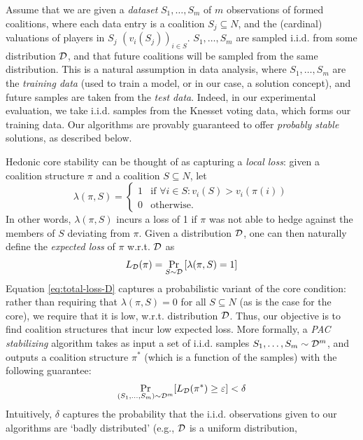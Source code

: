 Assume that we are given a {\em dataset} $S_1,\dots,S_m$ of $m$ observations
of formed coalitions, where each data entry is a coalition $S_j \subseteq N$,
and the (cardinal) valuations of players in $S_j$ $(v_i(S_j))_{i \in S}$.
$S_1,\dots,S_m$ are sampled i.i.d. from some distribution $\cal D$, and that
future coalitions will be sampled from the same distribution.
This is a natural assumption in data analysis, where $S_1,\dots,S_m$ are the
{\em training data} (used to train a model, or in our case, a solution concept),
and future samples are taken from the {\em test data}.
Indeed, in our experimental evaluation, we take i.i.d. samples from the Knesset
voting data, which forms our training data.
Our algorithms are provably guaranteed to offer {\em probably stable} solutions,
as described below.

Hedonic core stability can be thought of as capturing a {\em local loss}: given
a coalition structure $\pi$ and a coalition $S \subseteq N$, let
$$\lambda(\pi,S) = \begin{cases}1 & \mbox{if }\forall i \in S: v_i(S) > v_i(\pi(i))\\0&\mbox{otherwise.}\end{cases}$$
In other words, $\lambda(\pi,S)$ incurs a loss of 1 if $\pi$ was not able to
hedge against the members of $S$ deviating from $\pi$. Given a distribution
$\cal D$, one can then naturally define the {\em expected loss} of $\pi$ w.r.t.
$\cal D$ as
\begin{align}
    L_{\cal D}(\pi) = \Pr_{S \sim \cal D}\left[\lambda(\pi,S) =1\right]\label{eq:total-loss-D}
\end{align}
Equation \eqref{eq:total-loss-D} captures a probabilistic variant of the core
condition: rather than requiring that $\lambda(\pi,S) = 0$ for all $S \subseteq N$
(as is the case for the core), we require that it is low, w.r.t. distribution $\cal D$.
Thus, our objective is to find coalition structures that incur low expected loss.
More formally, a {\em PAC stabilizing} algorithm takes as input a set of i.i.d.
samples $S_1,\dots,S_m \sim \cal D^m$, and outputs a coalition structure $\pi^*$
(which is a function of the samples) with the following guarantee:
\begin{align}
    \Pr_{(S_1,\dots,S_m)\sim \cal D^m}[L_{\cal D}(\pi^*) \ge \eps]< \delta \label{eq:pac-stable}
\end{align}
Intuitively, $\delta$ captures the probability that the i.i.d. observations given
to our algorithms are `badly distributed' (e.g., $\cal D$ is a uniform distribution,
